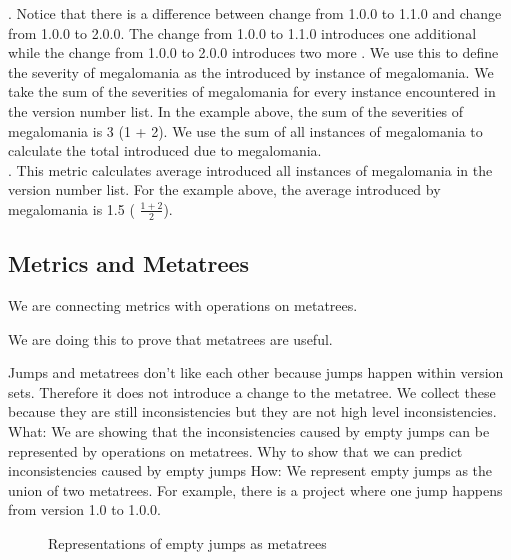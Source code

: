 \documentclass[conference]{IEEEtran}
\begin{document}
.  
Notice that there is a difference between change from 1.0.0 to 1.1.0 and change from 1.0.0 to 2.0.0. 
The change from 1.0.0 to 1.1.0 introduces one additional \choice while the change from 1.0.0 to 2.0.0 introduces two more \choices.
We use this to define the severity of megalomania as the \numberextrachoices introduced by instance of megalomania.
 We take the sum of the severities of megalomania for every instance encountered in  the version number list.
In the example above, the sum of the severities of megalomania is 3 (1 + 2).
We use the sum of all instances of megalomania to calculate the total \numberchoices introduced due to megalomania. \\

 
. 
This metric calculates average \numberchoices introduced all instances of megalomania in the version number list. For the example above, the average \numberchoices introduced by megalomania is 1.5 ( $\frac{ 1 + 2}{2}$).
 \\


\subsection{Metrics and Metatrees}

We are connecting metrics with operations on metatrees.

We are doing this to prove that metatrees are useful.

Jumps and metatrees don't like each other because jumps happen within version sets. 
Therefore it does not introduce a change to the metatree.
We collect these because they are still inconsistencies but they are not high level inconsistencies. \\

What: We are showing that the inconsistencies caused by empty jumps can be represented by operations on metatrees.
Why to show that we can predict inconsistencies caused by empty jumps
How: We represent empty jumps as the union of two metatrees. 
For example, there is a project where one jump happens from version 1.0 to 1.0.0. 


\begin{figure}
\begin{center}
 \begin{adjustbox}{width=.5\textwidth}

\end{adjustbox}
\end{center}
\caption{Representations of empty jumps as metatrees}
\label{fig:emptyJumpMeta}
\end{figure}
\end{document}
